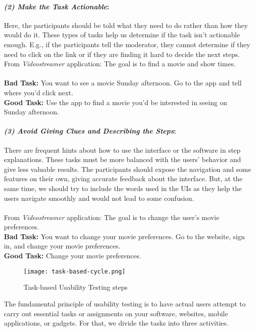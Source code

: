 \paragraph{\textit{(2) Make the Task Actionable}:}
Here, the participants should be told what they need to do rather than how they would do it.
These types of tasks help us determine if the task isn’t actionable enough. 
E.g., if the participants tell the moderator, they cannot determine if they need to click on the link or if they are finding it hard to decide the next steps. \\
From \textit{Videostreamer} application: The goal is to find a movie and show times. \\\\
\textbf{Bad Task: } You want to see a movie Sunday afternoon. Go to the app and tell where you’d click next. \\
\textbf{Good Task: } Use the app to find a movie you’d be interested in seeing on Sunday afternoon. \\

\paragraph{\textit{(3) Avoid Giving Clues and Describing the Steps}:}
There are frequent hints about how to use the interface or the software in step explanations.
These tasks must be more balanced with the users' behavior and give less valuable results.   
The participants should expose the navigation and some features on their own, giving accurate feedback about the interface.
But, at the same time, we should try to include the words used in the UIs as they help the users navigate smoothly and would not lead to some confusion. \\\\
From \textit{Videostreamer} application: The goal is to change the user's movie preferences. \\
\textbf{Bad Task: } You want to change your movie preferences. Go to the website, sign in, and change your movie preferences. \\
\textbf{Good Task: } Change your movie preferences.

\begin{figure}[htbp!]
  \centering    
  \texttt{[image: task-based-cycle.png]}
  \caption[Tasks steps]{Task-based Usability Testing steps}
  \label{fig:background:taskssteps}
\end{figure}
The fundamental principle of usability testing is to have actual users attempt to carry out essential tasks or assignments on your software, websites, mobile applications, or gadgets.
For that, we divide the tasks into three activities.
